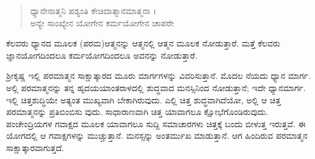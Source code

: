 \begin{verse}
ಧ್ಯಾನೇನಾತ್ಮನಿ ಪಶ್ಯಂತಿ ಕೇಚಿದಾತ್ಮಾನಮಾತ್ಮನಾ ।\\ಅನ್ಯೇ ಸಾಂಖ್ಯೇನ ಯೋಗೇನ ಕರ್ಮಯೋಗೇನ ಚಾಪರೇ 
\end{verse}

{\small ಕೆಲವರು ಧ್ಯಾನದ ಮೂಲಕ (ಪರಮ)ಆತ್ಮನನ್ನು ಆತ್ಮನಲ್ಲಿ ಆತ್ಮನ ಮೂಲಕ ನೋಡುತ್ತಾರೆ. ಮತ್ತೆ ಕೆಲವರು ಜ್ಞಾನಯೋಗದಿಂದಲೂ ಕರ್ಮಯೋಗದಿಂದಲೂ ಅವನನ್ನು ನೋಡುತ್ತಾರೆ.}

ಶ್ರೀಕೃಷ್ಣ ಇಲ್ಲಿ ಪರಮಾತ್ಮನ ಸಾಕ್ಷಾತ್ಕಾರದ ಮೂರು ಮಾರ್ಗಗಳನ್ನು ವಿವರಿಸುತ್ತಾನೆ. ಮೊದಲ ನೆಯದು ಧ್ಯಾನ ಮಾರ್ಗ. ಅಲ್ಲಿ ಪರಮಾತ್ಮನನ್ನು ತನ್ನ ಹೃದಯಯಾಂತರಾಳದಲ್ಲಿ ಶುದ್ಧವಾದ ಮನಸ್ಸಿನಿಂದ ನೋಡುತ್ತಾನೆ; ಇದೇ ಧ್ಯಾನಮಾರ್ಗ. ಇಲ್ಲಿ ಚಿತ್ತಶುದ್ಧಿಯೇ ಅತ್ಯಂತ ಮುಖ್ಯವಾಗಿ ಬೇಕಾಗಿರುವುದು. ಎಲ್ಲಿ ಚಿತ್ತ ಶುದ್ಧವಾಗಿದೆಯೋ, ಅಲ್ಲಿ ಆ ಚಿತ್ತ ಪರಮಾತ್ಮನನ್ನು ಪ್ರತಿಬಿಂಬಿಸು ವುದು. ಸಾಧಾರಾಣವಾಗಿ ಚಿತ್ತ ಯಾವಾಗಲೂ ಕ್ಷೋಭೆಗೊಂಡಿರುವುದು. ಪಂಚೇಂದ್ರಿಯಗಳ ಗವಾಕ್ಷದ ಮೂಲಕ ಯಾವಾಗಲೂ ಸುದ್ದಿ ಸಮಾಚಾರಗಳು ಚಿತ್ತಕ್ಕೆ ಬಂದು ಬೀಳುತ್ತ ಇರುತ್ತವೆ. ಈ ಯೋಗದಲ್ಲಿ ಆ ಗವಾಕ್ಷಗಳನ್ನು ಮುಚ್ಚುತ್ತಾನೆ. ಮನಸ್ಸನ್ನು ಅಂತರ್ಮುಖ ಮಾಡುತ್ತಾನೆ. ಆಗ ಹಿಂದಿರುವ ಪರಮಾತ್ಮನ ಸಾಕ್ಷಾತ್ಕಾರವಾಗುತ್ತದೆ.

